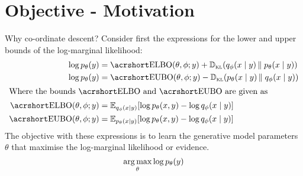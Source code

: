 
\section{Objective - Motivation}
\label{sec:mot}

Why co-ordinate descent?
%
Consider first the expressions for the lower and upper bounds of the
log-marginal likelihood:
%
\begin{align*}
  \log \p[\theta]{y}
  &=\fnP{\ELBO}{\theta, \phi; y} + \KL{\q[\phi]{x \given y}}{\p[\theta]{x \given y}}\\
  \log \p[\theta]{y}
  &=\fnP{\EUBO}{\theta, \phi; y} - \KL{\p[\theta]{x \given y}}{\q[\phi]{x \given y}}\\
  \intertext{Where the bounds \(\ELBO\) and \(\EUBO\) are given as}
  \fnP{\ELBO}{\theta, \phi; y}
  &=\Ex[{\q[\phi]{x \given y}}]{\log \p[\theta]{x, y} - \log \q[\phi]{x \given y}}\\
  \fnP{\EUBO}{\theta, \phi; y}
  &=\Ex[{\p[\theta]{x \given y}}]{\log \p[\theta]{x, y} - \log \q[\phi]{x \given y}}
\end{align*}
%
The objective with these expressions is to learn the generative model
parameters~\(\theta\) that maximise the log-marginal likelihood or evidence.
%
\[\argmax_{\theta} \log \p[\theta]{y} \]



